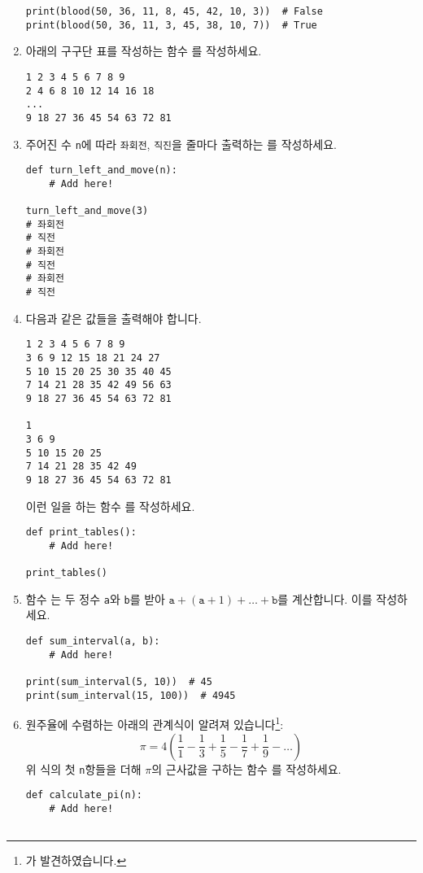 \documentclass[../main.tex]{subfiles}
\begin{document}
\begin{enumerate}
\begin{verbatim}
print(blood(50, 36, 11, 8, 45, 42, 10, 3))  # False
print(blood(50, 36, 11, 3, 45, 38, 10, 7))  # True
\end{verbatim}

\item 아래의 구구단 표를 작성하는 함수 를 작성하세요.
\begin{verbatim}
1 2 3 4 5 6 7 8 9
2 4 6 8 10 12 14 16 18
...
9 18 27 36 45 54 63 72 81
\end{verbatim}

\item 주어진 수 \verb|n|에 따라 \verb|좌회전|, \verb|직진|을 줄마다 출력하는
  를 작성하세요.
\begin{verbatim}
def turn_left_and_move(n):
    # Add here!

turn_left_and_move(3)
# 좌회전
# 직전
# 좌회전
# 직전
# 좌회전
# 직전
\end{verbatim}

\item 다음과 같은 값들을 출력해야 합니다.
\begin{verbatim}
1 2 3 4 5 6 7 8 9
3 6 9 12 15 18 21 24 27
5 10 15 20 25 30 35 40 45
7 14 21 28 35 42 49 56 63
9 18 27 36 45 54 63 72 81

1
3 6 9
5 10 15 20 25
7 14 21 28 35 42 49
9 18 27 36 45 54 63 72 81
\end{verbatim}
이런 일을 하는 함수 를 작성하세요.
\begin{verbatim}
def print_tables():
    # Add here!

print_tables()
\end{verbatim}

\item 함수 는 두 정수 \verb/a/와 \verb/b/를 받아 $\texttt{a} + (\texttt{a} + 1) + \dots + \texttt{b}$를 계산합니다.
  이를 작성하세요.
\begin{verbatim}
def sum_interval(a, b):
    # Add here!

print(sum_interval(5, 10))  # 45
print(sum_interval(15, 100))  # 4945
\end{verbatim}

\item 원주율에 수렴하는 아래의 관계식이 알려져 있습니다\footnote{가 발견하였습니다.}:
\[
\pi = 4\left(\frac11 - \frac13 + \frac 15 - \frac17 + \frac19 - \dots\right)
\]
위 식의 첫 \verb/n/항들을 더해 $\pi$의 근사값을 구하는 함수 를 작성하세요.
\begin{verbatim}
def calculate_pi(n):
    # Add here!


\end{verbatim}
\end{enumerate}
\end{document}
